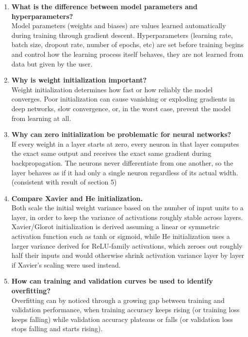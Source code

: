 \documentclass[10pt]{article}
\begin{document}
\begin{enumerate}

\item \textbf{What is the difference between model parameters and hyperparameters?}\\
Model parameters (weights and biases) are values learned automatically during training through gradient descent. Hyperparameters (learning rate, batch size, dropout rate, number of epochs, etc) are set before training begins and control how the learning process itself behaves, they are not learned from data but given by the user.\\

\item \textbf{Why is weight initialization important?}\\
Weight initialization determines how fast or how reliably the model converges. Poor initialization can cause vanishing or
exploding gradients in deep networks, slow convergence, or, in the worst case, prevent the model from learning at all.\\

\item \textbf{Why can zero initialization be problematic for neural networks?}\\
If every weight in a layer starts at zero, every neuron in that layer
computes the exact same output and receives the exact same gradient
during backpropagation. The neurons never differentiate from one
another, so the layer behaves as if it had only a single neuron
regardless of its actual width. (consistent with result of section 5)\\

\item \textbf{Compare Xavier and He initialization.}\\
Both scale the initial weight variance based on the number of input units to a layer, in order to keep the variance of activations roughly stable across layers. Xavier/Glorot initialization is derived assuming a linear or symmetric activation function such as tanh or sigmoid, while He initialization uses a larger variance derived for ReLU-family activations, which zeroes out roughly half their inputs and would otherwise shrink activation variance layer by layer if Xavier's scaling were used instead.\\

\item \textbf{How can training and validation curves be used to identify overfitting?}\\
Overfitting can by noticed through a growing gap between training and validation performance, when training accuracy keeps rising (or training loss keeps falling) while validation accuracy plateaus or falls (or validation loss stops falling and starts rising).\\


\end{enumerate}
\end{document}
